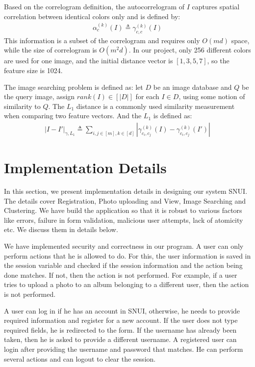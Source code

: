 \documentclass[10pt,twocolumn,letterpaper]{article}
\begin{document}
Based on the correlogram definition, the autocorrelogram of $I$ captures spatial correlation between identical colors only and is defined by:
\begin{equation}
	\begin{aligned}
		\alpha_{c}^{(k)}(I) \triangleq \gamma_{c,c}^{(k)}(I)
	\end{aligned}
\end{equation}
This information is a subset of the correlogram and requires only $O(md)$ space, while the size of correlogram is $O(m^2d)$.
In our project, only 256 different colors are used for one image, and the initial distance vector is $[1,3,5,7]$, so the feature size is 1024.

The image searching problem is defined as: let $D$ be an image database and $Q$ be the query image, assign $rank(I) \in [|D|]$ for each $I \in D$, using some notion of similarity to $Q$. The $L_{1}$ distance is a commonly used similarity measurement when comparing two feature vectors. And the $L_{1}$ is defined as:
\begin{equation}
	\begin{aligned}
		|I-I'|_{\gamma,L_{1}} \triangleq \sum_{i,j \in [m],k \in [d]} |\gamma_{c_{i},c_{j}}^{(k)}(I)-\gamma_{c_{i},c_{j}}^{(k)}(I')|
	\end{aligned}
\end{equation}

\section{Implementation Details}
In this section, we present implementation details in designing our system SNUI. The details cover Registration, Photo uploading and View, Image Searching and Clustering. We have build the application so that it is robust to various factors like errors, failure in form validation, malicious user attempts, lack of atomicity etc. We discuss them in details below.

We have implemented security and correctness in our program. A user can only perform actions that he is allowed to do. For this, the user information is saved in the session variable and checked if the session information and the action being done matches. If not, then the action is not performed. For example, if a user tries to upload a photo to an album belonging to a different user, then the action is not performed.

A user can log in if he has an account in SNUI, otherwise, he needs to provide required information and register for a new account. If the user does not type required fields, he is redirected to the form. If the username has already been taken, then he is asked to provide a different username. A registered user can login after providing the username and password that matches. He can perform several actions and can logout to clear the session.
\end{document}
